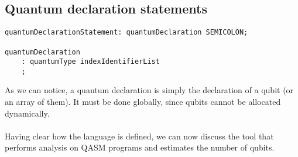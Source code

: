 \documentclass[12pt,a4paper]{report}
\theoremstyle{definition}
\theoremstyle{definition}
\theoremstyle{definition}
\begin{document}
\subsection{Quantum declaration statements}
\begin{lstlisting}
quantumDeclarationStatement: quantumDeclaration SEMICOLON;

quantumDeclaration
    : quantumType indexIdentifierList
    ;
\end{lstlisting}
As we can notice, a quantum declaration is simply the declaration of a qubit (or an array of them). It must be done globally, since qubits cannot be allocated dynamically.\\\\
Having clear how the language is defined, we can now discuss the tool that performs analysis on QASM programs and estimates the number of qubits.
\end{document}
